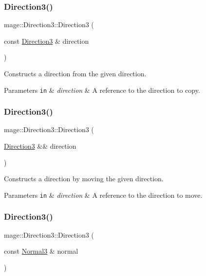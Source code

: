 \subsubsection{\texorpdfstring{Direction3()}{Direction3()}\hspace{0.1cm}{\footnotesize\ttfamily [3/8]}}
{\footnotesize\ttfamily mage\+::\+Direction3\+::\+Direction3 (\begin{DoxyParamCaption}\item[{const \hyperlink{structmage_1_1_direction3}{Direction3} \&}]{direction }\end{DoxyParamCaption})}

Constructs a direction from the given direction.


\begin{DoxyParams}[1]{Parameters}
\mbox{\tt in}  & {\em direction} & A reference to the direction to copy. \\
\hline
\end{DoxyParams}
\hypertarget{structmage_1_1_direction3_a0cefb5629c90c18fe48e4528415f95e9}{}\label{structmage_1_1_direction3_a0cefb5629c90c18fe48e4528415f95e9} 
\subsubsection{\texorpdfstring{Direction3()}{Direction3()}\hspace{0.1cm}{\footnotesize\ttfamily [4/8]}}
{\footnotesize\ttfamily mage\+::\+Direction3\+::\+Direction3 (\begin{DoxyParamCaption}\item[{\hyperlink{structmage_1_1_direction3}{Direction3} \&\&}]{direction }\end{DoxyParamCaption})}

Constructs a direction by moving the given direction.


\begin{DoxyParams}[1]{Parameters}
\mbox{\tt in}  & {\em direction} & A reference to the direction to move. \\
\hline
\end{DoxyParams}
\hypertarget{structmage_1_1_direction3_a18282959c79c93d25488d72f944495e3}{}\label{structmage_1_1_direction3_a18282959c79c93d25488d72f944495e3} 
\subsubsection{\texorpdfstring{Direction3()}{Direction3()}\hspace{0.1cm}{\footnotesize\ttfamily [5/8]}}
{\footnotesize\ttfamily mage\+::\+Direction3\+::\+Direction3 (\begin{DoxyParamCaption}\item[{const \hyperlink{structmage_1_1_normal3}{Normal3} \&}]{normal }\end{DoxyParamCaption})}

